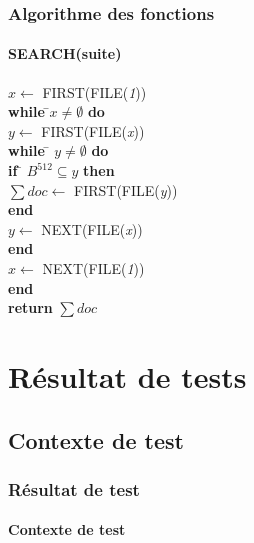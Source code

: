 \documentclass[hyperref={pdfpagemode=FullScreen,colorlinks=true},xcolor=pst,dvips]{beamer}\usepackage[french]{babel}
\begin{document}
	\begin{frame}[shrink]
		\frametitle{Algorithme des fonctions}
		\framesubtitle{SEARCH(suite)}
		\begin{framed}
			\begin{tabbing}
				$x \leftarrow$ FIRST(FILE(\textit{1}))\\
				\textbf{while }\=$x \neq \emptyset$\textbf{ do}\\
					\> $y \leftarrow $ FIRST(FILE(\textit{x}))\\
					\> \textbf{while }\= $y \neq \emptyset$\textbf{ do}\\
					\> \> \textbf{if }\= $B^{512} \subseteq y$\textbf{ then}\\
					\> \> \> $\sum doc \leftarrow$ FIRST(FILE(\textit{y}))\\
					\> \> \textbf{end}\\
					\> \> $y \leftarrow$ NEXT(FILE(\textit{x}))\\
					\> \textbf{end}\\
					\> $x \leftarrow$ NEXT(FILE(\textit{1}))\\
				\textbf{end}\\
				\textbf{return} $\sum doc$
			\end{tabbing}
		\end{framed}
	\end{frame}
	
	\section{Résultat de tests}
	\subsection{Contexte de test}
	\begin{frame}
		\frametitle{Résultat de test}
		\framesubtitle{Contexte de test}
	\end{frame}
	
\end{document}
